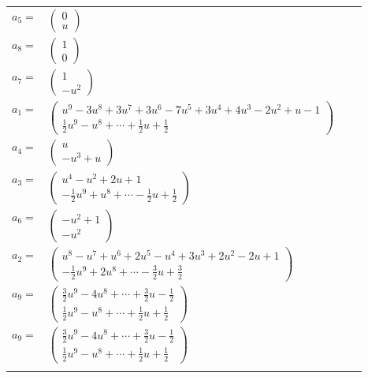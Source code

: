 \documentclass[1p]{elsarticle_modified}
\theoremstyle{definition}
\begin{document}
\begin{tabular}{m{7pt} m{180pt} m{7pt} m{180pt} }
\flushright $a_{5}=$&$\begin{pmatrix}0\\u\end{pmatrix}$ \\
\flushright $a_{8}=$&$\begin{pmatrix}1\\0\end{pmatrix}$ \\
\flushright $a_{7}=$&$\begin{pmatrix}1\\- u^2\end{pmatrix}$ \\
\flushright $a_{1}=$&$\begin{pmatrix}u^9-3 u^8+3 u^7+3 u^6-7 u^5+3 u^4+4 u^3-2 u^2+u-1\\\frac{1}{2} u^9- u^8+\cdots+\frac{1}{2} u+\frac{1}{2}\end{pmatrix}$ \\
\flushright $a_{4}=$&$\begin{pmatrix}u\\- u^3+u\end{pmatrix}$ \\
\flushright $a_{3}=$&$\begin{pmatrix}u^4- u^2+2 u+1\\-\frac{1}{2} u^9+u^8+\cdots-\frac{1}{2} u+\frac{1}{2}\end{pmatrix}$ \\
\flushright $a_{6}=$&$\begin{pmatrix}- u^2+1\\- u^2\end{pmatrix}$ \\
\flushright $a_{2}=$&$\begin{pmatrix}u^8- u^7+u^6+2 u^5- u^4+3 u^3+2 u^2-2 u+1\\-\frac{1}{2} u^9+2 u^8+\cdots-\frac{3}{2} u+\frac{3}{2}\end{pmatrix}$ \\
\flushright $a_{9}=$&$\begin{pmatrix}\frac{3}{2} u^9-4 u^8+\cdots+\frac{3}{2} u-\frac{1}{2}\\\frac{1}{2} u^9- u^8+\cdots+\frac{1}{2} u+\frac{1}{2}\end{pmatrix}$\\ \flushright $a_{9}=$&$\begin{pmatrix}\frac{3}{2} u^9-4 u^8+\cdots+\frac{3}{2} u-\frac{1}{2}\\\frac{1}{2} u^9- u^8+\cdots+\frac{1}{2} u+\frac{1}{2}\end{pmatrix}$\\&\end{tabular}
\end{document}
